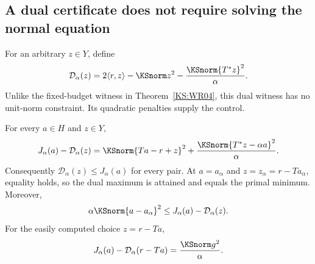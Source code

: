 \subsection{A dual certificate does not require solving the normal equation}
For an arbitrary $z\in Y$, define
\[
 \mathcal D_\alpha(z)=2\langle r,z\rangle-\KSnorm z^2
                    -\frac{\KSnorm{T^*z}^2}{\alpha}.
\]
Unlike the fixed-budget witness in Theorem~\ref{KS:WR04}, this dual witness has no unit-norm constraint. Its quadratic penalties supply the control.

\begin{KStheorem}\label{KS:WR14}
For every $a\in H$ and $z\in Y$,
\begin{equation}\label{KS:eq:regularized-duality-gap}
 J_\alpha(a)-\mathcal D_\alpha(z)
 =\KSnorm{Ta-r+z}^2+
   \frac{\KSnorm{T^*z-\alpha a}^2}{\alpha}.
\end{equation}
Consequently $\mathcal D_\alpha(z)\le J_\alpha(a)$ for every pair. At
$a=a_\alpha$ and $z=z_\alpha=r-Ta_\alpha$, equality holds, so the dual maximum is attained and equals the primal minimum. Moreover,
\[
 \alpha\KSnorm{a-a_\alpha}^2
 \le J_\alpha(a)-\mathcal D_\alpha(z).
\]
For the easily computed choice $z=r-Ta$,
\begin{equation}\label{KS:eq:residual-dual-gap}
 J_\alpha(a)-\mathcal D_\alpha(r-Ta)=\frac{\KSnorm g^2}{\alpha}.
\end{equation}
\end{KStheorem}

